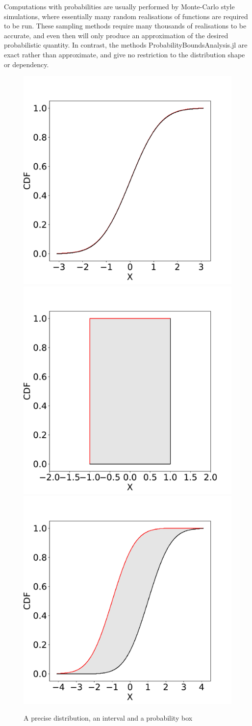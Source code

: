 \documentclass{juliacon}
\begin{document}
Computations with probabilities are usually performed by Monte-Carlo style simulations, where essentially many random realisations of functions are required to be run. These sampling methods require many thousands of realisations to be accurate, and even then will only produce an approximation of the desired probabilistic quantity. In contrast, the methods ProbabilityBoundsAnalysis.jl are exact rather than approximate, and give no restriction to the distribution shape or dependency.
\fi
\begin{figure}[htp]

  \centering
  \includegraphics[width=.3\textwidth]{../examples/JuliaCon/fig1/fig1_dist.pdf}\hfill
  \includegraphics[width=.3\textwidth]{../examples/JuliaCon/fig1/fig1_interval.pdf}\hfill
  \includegraphics[width=.3\textwidth]{../examples/JuliaCon/fig1/fig1_pbox.pdf}
  
  \caption{A precise distribution, an interval and a probability box}
  \label{fig:figure1}
  
\end{figure}
\end{document}
